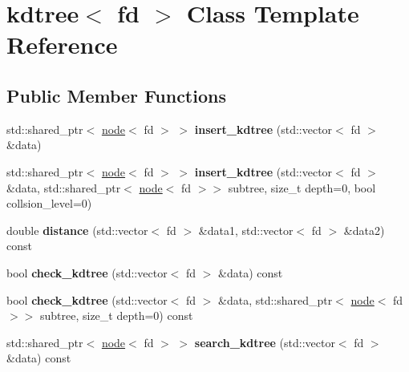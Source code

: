 \hypertarget{classkdtree}{}\section{kdtree$<$ fd $>$ Class Template Reference}
\label{classkdtree}
\subsection*{Public Member Functions}
\begin{DoxyCompactItemize}
\item 
\mbox{\label{classkdtree_a42af3021231ec8fceff78d6f309d2571}} 
std\+::shared\+\_\+ptr$<$ \hyperlink{classnode}{node}$<$ fd $>$ $>$ {\bfseries insert\+\_\+kdtree} (std\+::vector$<$ fd $>$ \&data)
\item 
\mbox{\label{classkdtree_a6ecd469b21764e96fd222835bef0ed0c}} 
std\+::shared\+\_\+ptr$<$ \hyperlink{classnode}{node}$<$ fd $>$ $>$ {\bfseries insert\+\_\+kdtree} (std\+::vector$<$ fd $>$ \&data, std\+::shared\+\_\+ptr$<$ \hyperlink{classnode}{node}$<$ fd $>$$>$ subtree, size\+\_\+t depth=0, bool collsion\+\_\+level=0)
\item 
\mbox{\label{classkdtree_a9c74e7b92f12990844c7c5ec9e840c2f}} 
double {\bfseries distance} (std\+::vector$<$ fd $>$ \&data1, std\+::vector$<$ fd $>$ \&data2) const
\item 
\mbox{\label{classkdtree_a8d48dc9f9e08bf609b94bd6721ef9cbd}} 
bool {\bfseries check\+\_\+kdtree} (std\+::vector$<$ fd $>$ \&data) const
\item 
\mbox{\label{classkdtree_a1ae73ba437b116c077d72f1895aeaf52}} 
bool {\bfseries check\+\_\+kdtree} (std\+::vector$<$ fd $>$ \&data, std\+::shared\+\_\+ptr$<$ \hyperlink{classnode}{node}$<$ fd $>$$>$ subtree, size\+\_\+t depth=0) const
\item 
\mbox{\label{classkdtree_a82969cfee401ee863d03ad6ff7488598}} 
std\+::shared\+\_\+ptr$<$ \hyperlink{classnode}{node}$<$ fd $>$ $>$ {\bfseries search\+\_\+kdtree} (std\+::vector$<$ fd $>$ \&data) const
\item 
\mbox{\label{classkdtree_aeb2f70117e2c254f9e7dc7e23376fa30}} 

\end{DoxyCompactItemize}
